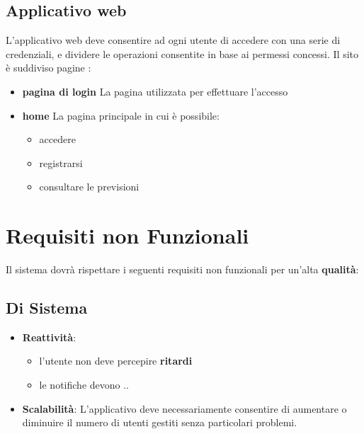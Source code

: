         \subsection{Applicativo web}
        L'applicativo web deve consentire ad ogni utente di accedere con una serie di credenziali, e dividere le operazioni consentite in base ai permessi concessi.
        Il sito è suddiviso pagine :
        \begin{itemize}
            \item \textbf{pagina di login}
                La pagina utilizzata per effettuare l'accesso
            \item \textbf{home}
                La pagina principale in cui è possibile:
                \begin{itemize}
                    \item accedere
                    \item registrarsi
                    \item consultare le previsioni
                \end{itemize}
            
        \end{itemize}
        
    
        
	\section{Requisiti non Funzionali}	
    Il sistema dovrà rispettare i seguenti requisiti non funzionali per un'alta \textbf{qualità}:
        \subsection{Di Sistema}
            \begin{itemize}
                \item \textbf{Reattività}: 
                    \begin{itemize}
                        \item l'utente non deve percepire \textbf{ritardi} 
                        \item le notifiche devono ..
                    \end{itemize}
                \item \textbf{Scalabilità}: L'applicativo deve necessariamente consentire di aumentare o diminuire il numero di utenti gestiti senza particolari problemi. 
            \end{itemize}
        


